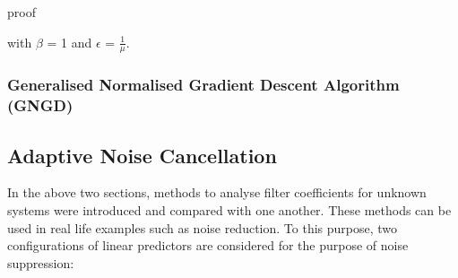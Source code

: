 \documentclass[main.tex]{subfiles}
\begin{document}
proof

with $\beta$ = 1 and $\epsilon$ = $\frac{1}{\mu}$.



\subsubsection{Generalised Normalised Gradient Descent Algorithm (GNGD)}





























\subsection{Adaptive Noise Cancellation}

In the above two sections, methods to analyse filter coefficients for unknown systems were introduced and compared with one another. These methods can be used in real life examples such as noise reduction.	To this purpose, two configurations of linear predictors are considered for the purpose of noise suppression:
\end{document}
